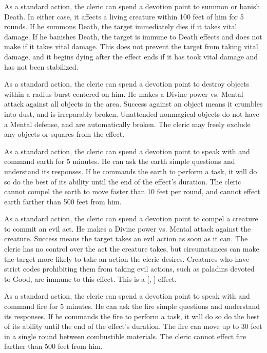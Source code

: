             As a standard action, the cleric can spend a devotion point to summon or banish Death.
            In either case, it affects a living creature within 100 feet of him for 5 rounds.
            If he summons Death, the target immediately dies if it takes vital damage.
            If he banishes Death, the target is immune to Death effects and does not make  if it takes vital damage.
            This does not prevent the target from taking vital damage, and it begins dying after the effect ends if it has took vital damage and has not been stabilized.

            As a standard action, the cleric can spend a devotion point to destroy objects within a \arealarge radius burst centered on him.
            He makes a Divine power vs. Mental attack against all objects in the area.
            Success against an object means it crumbles into dust, and is irreparably broken.
            Unattended nonmagical objects do not have a Mental defense, and are automatically broken.
            The cleric may freely exclude any objects or squares from the effect.

            As a standard action, the cleric can spend a devotion point to speak with and command earth for 5 minutes.
            He can ask the earth simple questions and understand its responses.
            If he commands the earth to perform a task, it will do so do the best of its ability until the end of the effect's duration.
            The cleric cannot compel the earth to move faster than 10 feet per round, and cannot effect earth farther than 500 feet from him.

            As a standard action, the cleric can spend a devotion point to compel a creature to commit an evil act.
            He makes a Divine power vs. Mental attack against the creature.
            Success means the target takes an evil action as soon as it can.
            The cleric has no control over the act the creature takes, but circumstances can make the target more likely to take an action the cleric desires.
            Creatures who have strict codes prohibiting them from taking evil actions, such as paladins devoted to Good, are immune to this effect.
            This is a [, ] effect.

            As a standard action, the cleric can spend a devotion point to speak with and command fire for 5 minutes.
            He can ask the fire simple questions and understand its responses.
            If he commands the fire to perform a task, it will do so do the best of its ability until the end of the effect's duration.
            The fire can move up to 30 feet in a single round between combustible materials.
            The cleric cannot effect fire farther than 500 feet from him.

